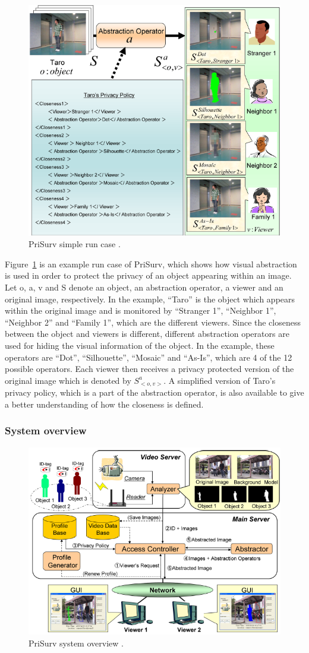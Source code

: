 \documentclass[conference]{IEEEtran}
\begin{document}
\begin{figure}[t]
\centerline{\includegraphics[width=.5\textwidth]{img//prisurv_simple_demo.png}}
\caption{PriSurv simple run case \cite{chinomi2008PriSurv}.}
\label{fig:prisurv}
\end{figure}

Figure~\ref{fig:prisurv} is an example run case of PriSurv, which shows how visual abstraction is used in order to protect the privacy of an object appearing within an image. Let o, a, v and S denote an object, an abstraction operator, a viewer and an original image, respectively. In the example, “Taro” is the object which appears within the original image and is monitored by “Stranger 1”, “Neighbor 1”, “Neighbor 2” and “Family 1”, which are the different viewers. Since the closeness between the object and viewers is different, different abstraction operators are used for hiding the visual information of the object. In the example, these operators are “Dot”, “Silhouette”, “Mosaic” and “As-Is”, which are 4 of the 12 possible operators. Each viewer then receives a privacy protected version of the original image which is denoted by $S_{<o, v>}^a$. A simplified version of Taro’s privacy policy, which is a part of the abstraction operator, is also available to give a better understanding of how the closeness is defined. 

\subsubsection{System overview}

\begin{figure}[t]
\centerline{\includegraphics[width=.5\textwidth]{img//prisurv_arch.png}}
\caption{PriSurv system overview \cite{chinomi2008PriSurv}.}
\label{fig:prisurv2}
\end{figure}
\end{document}
